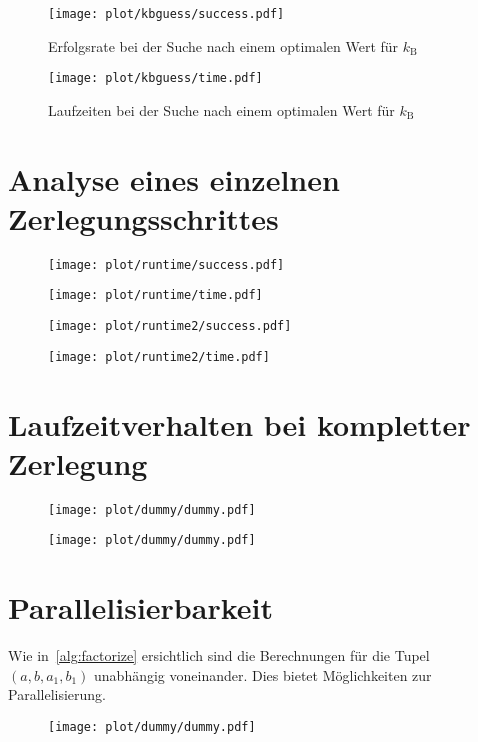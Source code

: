\begin{figure}[ht]
		\centering
		\texttt{[image: plot/kbguess/success.pdf]}
		\caption{Erfolgsrate bei der Suche nach einem optimalen Wert für $k_\mathrm{B}$}\label{fig:kbguess-success}
\end{figure}
\begin{figure}[ht]
		\centering
		\texttt{[image: plot/kbguess/time.pdf]}
		\caption{Laufzeiten bei der Suche nach einem optimalen Wert für $k_\mathrm{B}$}\label{fig:kbguess-runtime}
\end{figure}

\section{Analyse eines einzelnen Zerlegungsschrittes}
\begin{figure}[ht]
		\centering
		\texttt{[image: plot/runtime/success.pdf]}
\end{figure}
\begin{figure}[ht]
		\centering
		\texttt{[image: plot/runtime/time.pdf]}
\end{figure}
\begin{figure}[ht]
		\centering
		\texttt{[image: plot/runtime2/success.pdf]}
\end{figure}
\begin{figure}[ht]
		\centering
		\texttt{[image: plot/runtime2/time.pdf]}
\end{figure}

\section{Laufzeitverhalten bei kompletter Zerlegung}
\begin{figure}[ht]
		\centering
		\texttt{[image: plot/dummy/dummy.pdf]}
\end{figure}
\begin{figure}[ht]
		\centering
		\texttt{[image: plot/dummy/dummy.pdf]}
\end{figure}

\section{Parallelisierbarkeit}\label{sec:parallel}
Wie in~\ref{alg:factorize} ersichtlich sind die Berechnungen für die Tupel $\left(a, b, a_1, b_1\right)$ unabhängig voneinander. Dies bietet Möglichkeiten zur Parallelisierung.
\begin{figure}[ht]
		\centering
		\texttt{[image: plot/dummy/dummy.pdf]}
\end{figure}
